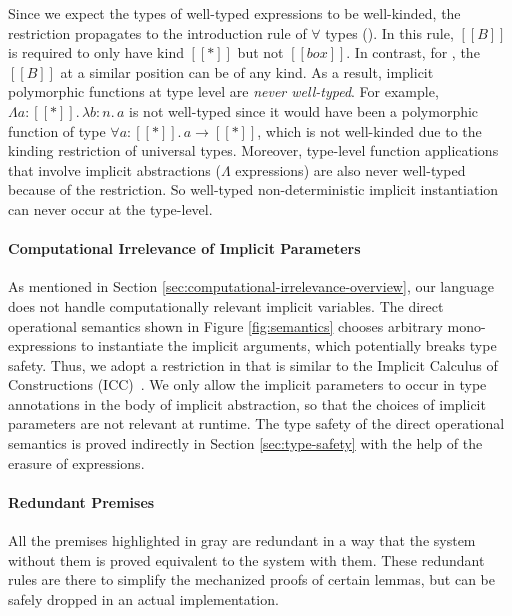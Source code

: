 Since we expect the types of well-typed expressions to be well-kinded,
the restriction propagates to the introduction rule of $\forall$ types ().
In this rule, $[[B]]$ is required to only have kind $[[*]]$ but not $[[box]]$.
In contrast, for , the $[[B]]$ at a similar position can be of any kind.
As a result, implicit polymorphic functions at type level are \emph{never well-typed}.
For example, $\Lambda a : [[*]].\, \lambda b : n.\, a$ is not
well-typed since it would have been a polymorphic function of type
$\forall a : [[*]].\, a \rightarrow [[*]]$, which is not well-kinded due to the
kinding restriction of universal types.
Moreover, type-level function applications that involve implicit
abstractions ($\Lambda$ expressions) are also never well-typed
because of the restriction. So well-typed non-deterministic implicit instantiation can never occur
at the type-level.

\paragraph{Computational Irrelevance of Implicit Parameters}

As mentioned in Section \ref{sec:computational-irrelevance-overview}, our language
does not handle computationally relevant implicit variables.
The direct operational semantics shown in Figure \ref{fig:semantics} chooses
arbitrary mono-expressions to instantiate the implicit arguments,
which potentially breaks type safety.
Thus, we adopt a restriction in  that is similar to the
Implicit Calculus of Constructions (ICC)~\cite{miquel2001implicit}.
We only allow the implicit parameters to occur in type annotations in the
body of implicit abstraction, so that the choices of implicit parameters are not
relevant at runtime. The type safety of the direct operational semantics is
proved indirectly in Section \ref{sec:type-safety} with the help of the
erasure of expressions.

\paragraph{Redundant Premises}

All the premises highlighted in gray are redundant in a way that
the system without them is proved equivalent to the system with them.
These redundant rules are there to simplify the mechanized proofs of
certain lemmas, but can be safely dropped in an actual implementation.


